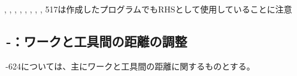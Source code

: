 \begin{marker}
, , , , , , , , \ttNum517は作成したプログラムでもRHSとして使用していることに注意
\end{marker}



\clearpage


\subsection{\,-：ワークと工具間の距離の調整}
\,-\ttNum624については、主にワークと工具間の距離に関するものとする。\\

